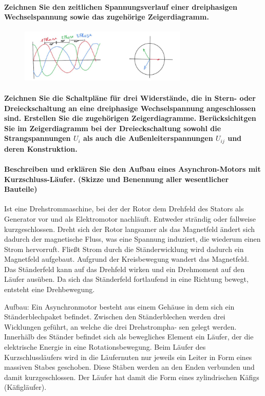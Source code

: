 \documentclass[a4paper, 11pt, parskip=half]{scrartcl}
\begin{document}
\paragraph{Zeichnen Sie den zeitlichen Spannungsverlauf einer dreiphasigen Wechselspannung sowie das
zugehörige Zeigerdiagramm.}


\begin{figure}[H]
    \centering
    \includegraphics[width=8cm]{image/9/wechselstrom4}
\end{figure}


\paragraph{Zeichnen Sie die Schaltpläne für drei Widerstände, die in Stern- oder Dreieckschaltung an
eine dreiphasige Wechselspannung angeschlossen sind. Erstellen Sie die zugehörigen Zeigerdiagramme.
Berücksichitgen Sie im Zeigerdiagramm bei der Dreieckschaltung sowohl die Strangspannungen $U_i$ als
auch die Außenleiterspannungen $U_{ij}$ und deren Konstruktion.}

\paragraph{Beschreiben und erklären Sie den Aufbau eines Asynchron-Motors mit Kurzschluss-Läufer.
(Skizze und Benennung aller wesentlicher Bauteile)}

Ist eine Drehstrommaschine, bei der der Rotor dem Drehfeld des Stators als Generator vor und als Elektromotor nachläuft. Entweder strändig oder fallweise kurzgeschlossen. Dreht sich der Rotor langsamer als das Magnetfeld ändert sich dadurch der magnetische Fluss, was eine Spannung induziert, die wiederum einen Strom hervorruft. Fließt Strom durch die Ständerwicklung wird dadurch ein Magnetfeld aufgebaut. Aufgrund der Kreisbewegung wandert das Magnetfeld. Das Ständerfeld kann auf das Drehfeld wirken und ein Drehmoment auf den Läufer ausüben. Da sich das Ständerfeld fortlaufend in eine Richtung bewegt, entsteht eine Drehbewegung.


Aufbau: Ein Asynchronmotor besteht aus einem Gehäuse in dem sich ein Ständerblechpaket befindet. Zwischen den Ständerblechen werden drei Wicklungen geführt, an welche die drei Drehstrompha- sen gelegt werden.
Innerhälb des Ständer befindet sich als bewegliches Element ein Läufer, der die elektrische Energie in eine Rotationsbewegung.
Beim Läufer des Kurzschlussläufers wird in die Läufernuten nur jeweils ein Leiter in Form eines massiven Stabes geschoben.
Diese Stäben werden an den Enden verbunden und damit kurzgeschlossen. Der Läufer hat damit die Form eines zylindrischen Käfigs (Käfigläufer).
\end{document}
